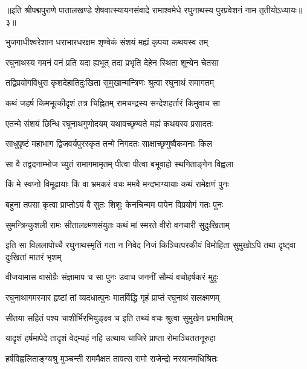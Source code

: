 {॥इति श्रीपद्मपुराणे पातालखण्डे शेषवात्स्यायनसंवादे रामाश्वमेधे रघुनाथस्य पुरप्रवेशनं नाम तृतीयोऽध्यायः॥३॥}



\twolineshloka
{भुजगाधीश्वरेशान धराभारधरक्षम}
{शृण्वेकं संशयं मह्यं कृपया कथयस्व तम्}%

\twolineshloka
{रघुनाथस्य गमनं वनं प्रति यदा ह्यभूत्}
{तदा प्रभृति देहेन स्थिता शून्येन चेतसा}%

\twolineshloka
{तद्विप्रयोगविधुरा कृशदेहातिदुःखिता}
{सुमुखान्मन्त्रिणः श्रुत्वा रघुनाथं समागतम्}%

\twolineshloka
{कथं जहर्ष किमभूत्कीदृशं तत्र चिह्नितम्}
{रामचन्द्रस्य सन्देशहर्तारं किमुवाच सा}%

\twolineshloka
{एतन्मे संशयं छिन्धि रघुनाथगुणोदयम्}
{यथावच्छृण्वते मह्यं कथयस्व प्रसादतः}%


\twolineshloka
{साधुपृष्टं महाभाग द्विजवर्यपुरस्कृत}
{तन्मे निगदतः साक्षाच्छृणुष्वैकमनाः किल}%

\twolineshloka
{सा वै तद्वदनाम्भोज च्युतं रामागमामृतम्}
{पीत्वा पीत्वा बभूवाहो स्थगिताङ्गेन विह्वला}%

\twolineshloka
{किं मे स्वप्नो विमूढायाः किं वा भ्रमकरं वचः}
{ममवै मन्दभाग्यायाः कथं रामेक्षणं पुनः}%

\twolineshloka
{बहुना तपसा कृत्वा प्राप्तोऽयं वै सुतः शिशुः}
{केनचिन्मम पापेन विप्रयोगं गतः पुनः}%

\twolineshloka
{सुमन्त्रिन्कुशली रामः सीतालक्ष्मणसंयुतः}
{कथं मां स्मरते वीरो वनचारी सुदुःखिताम्}%


\twolineshloka
इति सा विललापोच्चै रघुनाथस्मृतिं गता
{न निवेद निजं किञ्चित्परकीयं विमोहिता}
{सुमुखोऽपि तथा दृष्ट्वा दुःखितां मातरं भृशम्}%

\twolineshloka
{वीजयामास वासोग्रैः संज्ञामाप च सा पुनः}
{उवाच जननीं सौम्यं वचोहर्षकरं मुहुः}%

\twolineshloka
{रघुनाथागमस्मार हृष्टां तां व्यदधात्पुनः}
{मातर्विद्धि गृहं प्राप्तं रघुनाथं सलक्ष्मणम्}%

\twolineshloka
{सीतया सहितं पश्य चाशीर्भिरभियुङ्क्ष्व च}
{इति तथ्यं वचः श्रुत्वा सुमुखेन प्रभाषितम्}%

\twolineshloka
{यादृशं हर्षमापेदे तादृशं वेद्म्यहं नहि}
{उत्थाय चाजिरे प्राप्ता रोमाञ्चिततनूरुहा}%

\twolineshloka
{हर्षविह्वलिताङ्ग्यश्रु मुञ्चन्ती राममैक्षत}
{तावत्स रामो राजेन्द्रो नरयानमधिश्रितः}%

